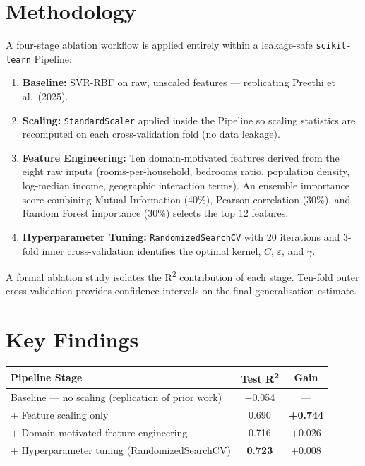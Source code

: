 \documentclass[12pt,a4paper]{article}
\begin{document}
\section{Methodology}

A four-stage ablation workflow is applied entirely within a leakage-safe
\texttt{scikit-learn} Pipeline:

\begin{enumerate}[leftmargin=1.8em]
  \item \textbf{Baseline:} SVR-RBF on raw, unscaled features --- replicating Preethi
        et al.\ (2025).
  \item \textbf{Scaling:} \texttt{StandardScaler} applied inside the Pipeline so scaling
        statistics are recomputed on each cross-validation fold (no data leakage).
  \item \textbf{Feature Engineering:} Ten domain-motivated features derived from the
        eight raw inputs (rooms-per-household, bedrooms ratio, population density,
        log-median income, geographic interaction terms). An ensemble importance score
        combining Mutual Information (40\%), Pearson correlation (30\%), and Random
        Forest importance (30\%) selects the top 12 features.
  \item \textbf{Hyperparameter Tuning:} \texttt{RandomizedSearchCV} with 20 iterations
        and 3-fold inner cross-validation identifies the optimal kernel, $C$,
        $\varepsilon$, and $\gamma$.
\end{enumerate}

A formal ablation study isolates the R\textsuperscript{2} contribution of each stage.
Ten-fold outer cross-validation provides confidence intervals on the final generalisation
estimate.

\section{Key Findings}

\vspace{4pt}
\begin{center}
\begin{tabular}{lcc}
\toprule
\textbf{Pipeline Stage} & \textbf{Test R\textsuperscript{2}} & \textbf{Gain} \\
\midrule
Baseline --- no scaling (replication of prior work) & $-$0.054 & --- \\
\quad + Feature scaling only                        & 0.690    & \textbf{+0.744} \\
\quad + Domain-motivated feature engineering        & 0.716    & +0.026 \\
\quad + Hyperparameter tuning (RandomizedSearchCV)  & \textbf{0.723} & +0.008 \\
\bottomrule
\end{tabular}
\end{center}
\vspace{6pt}
\end{document}
